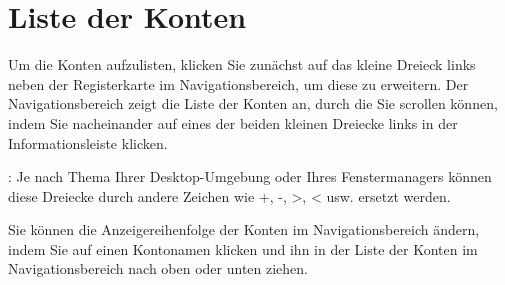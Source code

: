 \section{Liste der Konten\label{accounts-list}}%

Um die Konten aufzulisten, klicken Sie zunächst auf das kleine Dreieck links neben der Registerkarte  im Navigationsbereich, um diese zu erweitern. Der Navigationsbereich zeigt die Liste der Konten an, durch die Sie scrollen können, indem Sie nacheinander auf eines der beiden kleinen Dreiecke links in der Informationsleiste klicken.

\Note{}: Je nach Thema Ihrer Desktop-Umgebung oder Ihres Fenstermanagers können diese Dreiecke durch andere Zeichen wie +, -, >, < usw. ersetzt werden.


Sie können die Anzeigereihenfolge der Konten im Navigationsbereich ändern, indem Sie auf einen Kontonamen klicken und ihn in der Liste der Konten im Navigationsbereich nach oben oder unten ziehen.


